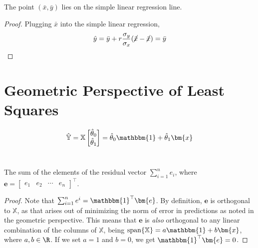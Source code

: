 \documentclass{article}
\newcommand{\X}{\mathbb{X}}
\newcommand{\Y}{\mathbb{Y}}
\newcommand{\One}{\mathbbm{1}}
\DeclareMathOperator{\Span}{span}
\begin{document}
\subsection{}

\begin{theorem}
    The point \((\bar{x}, \bar{y})\) lies on the simple linear regression line.
\end{theorem}
\begin{proof}
    Plugging \(\bar{x}\) into the simple linear regression,
    \begin{equation}
        \hat{y} = \bar{y} + r \frac{\sigma_y}{\sigma_x} (\cancel{\bar{x}} - \cancel{\bar{x}}) = \bar{y}
    \end{equation}
\end{proof}

\section*{Geometric Perspective of Least Squares}

\begin{equation}
    \hat{\Y} =
    \X
    \begin{bmatrix}
        \hat{\theta}_0 \\
        \hat{\theta}_1
    \end{bmatrix} = \hat{\theta}_0 \One + \hat{\theta}_1 \bm{x}
\end{equation}

\section{}

\subsection{}

\begin{theorem}
    The sum of the elements of the residual vector \(\sum_{i = 1}^n e_i\), where \(\bm{e} =
    \begin{bmatrix}
        e_1 & e_2 & \cdots & e_n
    \end{bmatrix}^\top\).
\end{theorem}
\begin{proof}
    Note that \(\sum_{i = 1}^n e^i = \One^\top \bm{e}\).
    By definition, \(\bm{e}\) is orthogonal to \(\X\), as that arises out of minimizing the norm of error in predictions as noted in the geometric perspective.
    This means that \(\bm{e}\) is \emph{also} orthogonal to any linear combination of the columns of \(\X\), being \(\Span\{\X\} = a\One + b\bm{x}\), where \(a, b \in \R\).
    If we set \(a = 1\) and \(b = 0\), we get \(\One^\top \bm{e} = 0\).
\end{proof}
\end{document}
